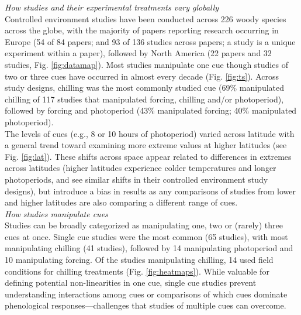 \documentclass[11pt,letter]{article}
\begin{document}
\emph{How studies and their experimental treatments vary globally}\\
Controlled environment studies have been conducted across 226 woody species across the globe, with the majority of papers reporting research occurring in Europe (54 of 84 papers; and 93 of 136 studies across papers; a study is a unique experiment within a paper), followed by North America (22 papers and 32 studies, Fig. \ref{fig:datamap}). Most studies manipulate one cue though studies of two or three cues have occurred in almost every decade (Fig. \ref{fig:ts}). Across study designs, chilling was the most commonly studied cue (69\% manipulated chilling of 117 studies that manipulated forcing, chilling and/or photoperiod), followed by forcing and photoperiod (43\% manipulated forcing; 40\% manipulated photoperiod). \\

The levels of cues (e.g., 8 or 10 hours of photoperiod) varied across latitude with a general trend toward examining more extreme values at higher latitudes (see Fig. \ref{fig:lat}). These shifts across space appear related to differences in extremes across latitudes (higher latitudes experience colder temperatures and longer photoperiods, and see similar shifts in their controlled environment study designs), but introduce a bias in results as any comparisons of studies from lower and higher latitudes are also comparing a different range of cues. \\



\emph{How studies manipulate cues}\\
Studies can be broadly categorized as manipulating one, two or (rarely) three cues at once. Single cue studies were the most common (65 studies),  with most manipulating chilling  (41 studies), followed by 14 manipulating photoperiod and 10 manipulating forcing. Of the studies manipulating chilling, 14 used field conditions for chilling treatments (Fig. \ref{fig:heatmaps}). While valuable for defining potential non-linearities in one cue, single cue studies prevent understanding interactions among cues or comparisons of which cues dominate phenological responses---challenges that studies of multiple cues can overcome. \\
\end{document}
